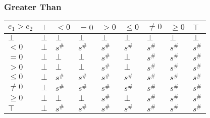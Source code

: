 \documentclass{beamer}
\begin{document}
                \begin{frame}
                    \frametitle{Greater Than}
                \begin{table}
                    \begin{tabular}{|l|l|l|l|l|l|l|l|l|}
                    \hline
                    $e_1 > e_2$ & $\bot$ & $<0$   & $=0$   & $>0$   & $\le 0$ & $\ne 0$ & $\ge 0$ & $\top$ \\ \hline
                    $\bot$      & $\bot$ & $\bot$ & $\bot$ & $\bot$ & $\bot$  & $\bot$  & $\bot$  & $\bot$ \\ \hline
                    $<0$        & $\bot$ & $s^\#$ & $s^\#$ & $s^\#$ & $s^\#$  & $s^\#$  & $s^\#$  & $s^\#$ \\ \hline
                    $=0$        & $\bot$ & $\bot$ & $\bot$ & $s^\#$ & $\bot$  & $s^\#$  & $s^\#$  & $s^\#$ \\ \hline
                    $>0$        & $\bot$ & $\bot$ & $\bot$ & $s^\#$ & $\bot$  & $s^\#$  & $s^\#$  & $s^\#$ \\ \hline
                    $\le 0$     & $\bot$ & $s^\#$ & $s^\#$ & $s^\#$ & $s^\#$  & $s^\#$  & $s^\#$  & $s^\#$ \\ \hline
                    $\ne 0$     & $\bot$ & $s^\#$ & $s^\#$ & $s^\#$ & $s^\#$  & $s^\#$  & $s^\#$  & $s^\#$ \\ \hline
                    $\ge 0$     & $\bot$ & $\bot$ & $\bot$ & $s^\#$ & $\bot$  & $s^\#$  & $s^\#$  & $s^\#$ \\ \hline
                    $\top$      & $\bot$ & $s^\#$ & $s^\#$ & $s^\#$ & $s^\#$  & $s^\#$  & $s^\#$  & $s^\#$ \\ \hline
                    \end{tabular}
                    \end{table}
                \end{frame}
\end{document}
